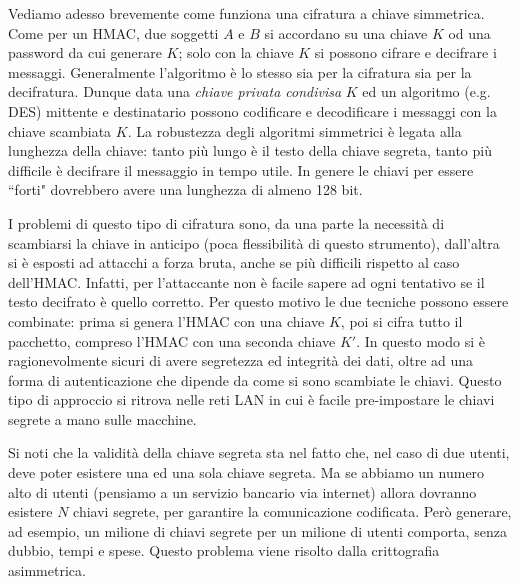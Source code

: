 Vediamo adesso brevemente come funziona una cifratura a chiave simmetrica. Come per un HMAC, due soggetti $A$ e $B$ si accordano su una chiave $K$ od una password da cui generare $K$; solo con la chiave $K$ si possono cifrare e decifrare i messaggi. Generalmente l'algoritmo è lo stesso sia per la cifratura sia per la decifratura. Dunque data una \textit{chiave privata condivisa} $K$ ed un algoritmo (e.g. DES) mittente e destinatario possono codificare e decodificare i messaggi con la chiave scambiata $K$. La robustezza degli algoritmi simmetrici è legata alla lunghezza della chiave: tanto più lungo è il testo della chiave segreta, tanto più difficile è decifrare il messaggio in tempo utile. In genere le chiavi per essere \textquotedblleft forti" dovrebbero avere una lunghezza di almeno 128 bit.

I problemi di questo tipo di cifratura sono, da una parte la necessità di scambiarsi la chiave in anticipo (poca flessibilità di questo strumento), dall'altra si è esposti ad attacchi a forza bruta, anche se più difficili rispetto al caso dell'HMAC. Infatti, per l'attaccante non è facile sapere ad ogni tentativo se il testo decifrato è quello corretto. Per questo motivo le due tecniche possono essere combinate: prima si genera l'HMAC con una chiave $K$, poi si cifra tutto il pacchetto, compreso l'HMAC con una seconda chiave $K'$. In questo modo si è ragionevolmente sicuri di avere segretezza ed integrità dei dati, oltre ad una forma di autenticazione che dipende da come si sono scambiate le chiavi. Questo tipo di approccio si ritrova nelle reti LAN in cui è facile pre-impostare le chiavi segrete a mano sulle macchine.

Si noti che la validità della chiave segreta sta nel fatto che, nel caso di due utenti, deve poter esistere una ed una sola chiave segreta. Ma se abbiamo un numero alto di utenti (pensiamo a un servizio bancario via internet) allora dovranno esistere $N$ chiavi segrete, per garantire la comunicazione codificata. Però generare, ad esempio, un milione di chiavi segrete per un milione di utenti comporta, senza dubbio, tempi e spese. Questo problema viene risolto dalla crittografia asimmetrica.

